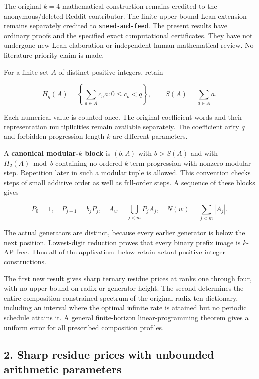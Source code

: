 \documentclass[11pt,a4paper]{article}
\begin{document}
The original \(k=4\) mathematical construction remains credited to the anonymous/deleted Reddit contributor. The finite upper-bound Lean extension remains separately credited to \texttt{sneed-and-feed}. The present results have ordinary proofs and the specified exact computational certificates. They have not undergone new Lean elaboration or independent human mathematical review. No literature-priority claim is made.

For a finite set \(A\) of distinct positive integers, retain

\[
H_q(A)=\left\{\sum_{a\in A}c_a a:0\le c_a<q\right\},
\qquad S(A)=\sum_{a\in A}a.
\]

Each numerical value is counted once. The original coefficient words and their representation multiplicities remain available separately. The coefficient arity \(q\) and forbidden progression length \(k\) are different parameters.

A \textbf{canonical modular-\(k\) block} is \((b,A)\) with \(b>S(A)\) and with \(H_2(A)\bmod b\) containing no ordered \(k\)-term progression with nonzero modular step. Repetition later in such a modular tuple is allowed. This convention checks steps of small additive order as well as full-order steps. A sequence of these blocks gives

\[
P_0=1,\quad P_{j+1}=b_jP_j,\quad
A_w=\bigcup_{j<m}P_jA_j,\quad N(w)=\sum_{j<m}|A_j|.
\]

The actual generators are distinct, because every earlier generator is below the next position. Lowest-digit reduction proves that every binary prefix image is \(k\)-AP-free. Thus all of the applications below retain actual positive integer constructions.

The first new result gives sharp ternary residue prices at ranks one through four, with no upper bound on radix or generator height. The second determines the entire composition-constrained spectrum of the original radix-ten dictionary, including an interval where the optimal infinite rate is attained but no periodic schedule attains it. A general finite-horizon linear-programming theorem gives a uniform error for all prescribed composition profiles.

\subsection{2. Sharp residue prices with unbounded arithmetic parameters}\label{eporig:sharp-residue-prices-with-unbounded-arithmetic-parameters}
\end{document}
